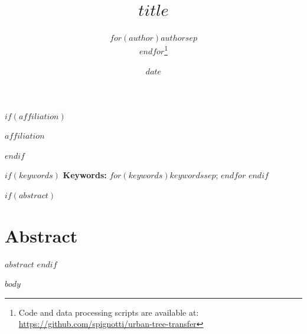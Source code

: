 \documentclass[11pt,a4paper]{scrartcl}
\title{$title$}
\author{$for(author)$$author$$sep$ \\ $endfor$\thanks{Code and data processing scripts are available at: \url{https://github.com/spignotti/urban-tree-transfer}}}
\date{$date$}
\date{}
\begin{document}
\maketitle

$if(affiliation)$
\begin{center}
\normalsize $affiliation$
\end{center}
$endif$

$if(keywords)$
\vspace{0.5em}
\noindent\textbf{Keywords:} $for(keywords)$$keywords$$sep$; $endfor$
$endif$

$if(abstract)$
\section*{Abstract}
$abstract$
\clearpage
{}
\setcounter{page}{2}
$endif$

$body$
\end{document}
